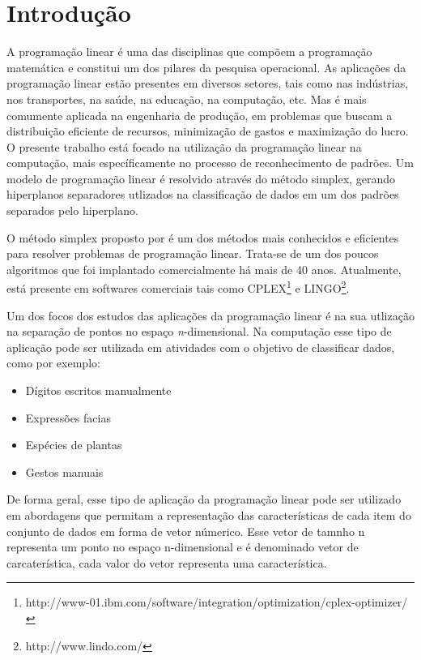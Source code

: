 \chapter{Introdução}

A programação linear é uma das disciplinas que compõem a programação matemática e constitui um dos pilares da pesquisa operacional. As aplicações da programação linear estão presentes em diversos setores, tais como nas indústrias, nos transportes, na saúde, na educação, na computação, etc. Mas é mais comumente aplicada na engenharia de produção, em problemas que buscam a distribuição eficiente de recursos, minimização de gastos e maximização do lucro. O presente trabalho está focado na utilização da programação linear na computação, mais específicamente no processo de reconhecimento de padrões. Um modelo de programação linear é resolvido através do método simplex, gerando hiperplanos separadores utlizados na classificação de dados em um dos padrões separados pelo hiperplano.

O método simplex proposto por  é um dos métodos mais conhecidos e eficientes para resolver problemas de programação linear. Trata-se de um dos poucos algoritmos que foi implantado comercialmente há mais de 40 anos. Atualmente, está presente em softwares comerciais tais como CPLEX\footnote{http://www-01.ibm.com/software/integration/optimization/cplex-optimizer/} e LINGO\footnote{http://www.lindo.com/}. 

Um dos focos dos estudos das aplicações da programação linear é na sua utlização na separação de pontos no espaço \textit{n}-dimensional. Na computação esse tipo de aplicação pode ser utilizada em atividades com o objetivo de classificar dados, como por exemplo:

\begin{itemize}
\item Dígitos escritos manualmente
\item Expressões facias
\item Espécies de plantas
\item Gestos manuais
\end{itemize}

De forma geral, esse tipo de aplicação da programação linear pode ser utilizado em abordagens que permitam a representação das características de cada item do conjunto de dados em forma de vetor númerico. Esse vetor de tamnho n representa um ponto no espaço n-dimensional e é denominado vetor de carcaterística, cada valor do vetor representa uma característica.

